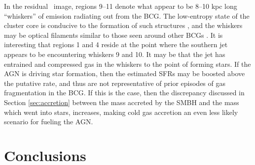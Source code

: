 \documentclass[iop]{emulateapj}
\begin{document}
In the residual \myi\ image, regions 9--11 denote what appear to be
8--10 kpc long ``whiskers'' of emission radiating out from the
BCG. The low-entropy state of the cluster core is conducive to the
formation of such structures \citep{conduction}, and the whiskers may
be optical filaments similar to those seen around other BCGs
\citep[\eg][]{2003MNRAS.344L..48F}. It is interesting that regions 1
and 4 reside at the point where the southern jet appears to be
encountering whiskers 9 and 10. It may be that the jet has entrained
and compressed gas in the whiskers to the point of forming stars. If
the AGN is driving star formation, then the estimated SFRs may be
boosted above the putative rate, and thus are not representative of
prior episodes of gas fragmentation in the BCG. If this is the case,
then the discrepancy discussed in Section \ref{sec:accretion} between
the mass accreted by the SMBH and the mass which went into stars,
increases, making cold gas accretion an even less likely scenario for
fueling the AGN.

\section{Conclusions}
\label{sec:con}
\end{document}

